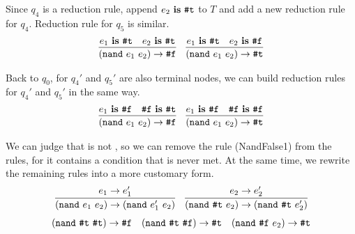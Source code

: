 Since $q_4$ is a reduction rule, append $e_2~\mbox{\rm \bf is}~\mbox{\tt \#t}$ to $T$ and add a new reduction rule for $q_4$. Reduction rule for $q_5$ is similar.
\[
    \begin{array}{c}
        \infer{(\m{nand}~e_1~e_2) \to \m{\#f}}{e_1~\key{is}~\m{\#t}\quad e_2~\key{is}~\m{\#t}}
        \quad
        \infer{(\m{nand}~e_1~e_2) \to \m{\#t}}{e_1~\key{is}~\m{\#t}\quad e_2~\key{is}~\m{\#f}}
    \end{array}
\]

Back to $q_0$, for $q_4'$ and $q_5'$ are also terminal nodes, we can build reduction rules for $q_4'$ and $q_5'$ in the same way.
\[
    \begin{array}{c}
        \infer{(\m{nand}~e_1~e_2) \to \m{\#f}}{e_1~\key{is}~\m{\#f}\quad \m{\#f}~\key{is}~\m{\#t}}
        \quad
        \infer{(\m{nand}~e_1~e_2) \to \m{\#t}}{e_1~\key{is}~\m{\#f}\quad \m{\#f}~\key{is}~\m{\#f}}
    \end{array}
\]

We can judge that  is not , so we can remove the rule (NandFalse1) from the rules, for it contains a condition that is never met. At the same time, we rewrite the remaining rules into a more customary form.
\[
    \begin{array}{cc}
        \infer{(\m{nand}~e_1~e_2) \to (\m{nand}~e_1'~e_2)}{e_1 \to e_1'}
         &
        \infer{(\m{nand}~\m{\#t}~e_2) \to (\m{nand}~\m{\#t}~e_2')}{e_2 \to e_2'}
    \end{array}
\]\[
    \begin{array}{ccc}
        (\mbox{\tt nand}~\mbox{\tt \#t}~\mbox{\tt \#t}) \to \mbox{\tt \#f}
         &
        (\mbox{\tt nand}~\mbox{\tt \#t}~\mbox{\tt \#f}) \to \mbox{\tt \#t}
         &
        (\mbox{\tt nand}~\mbox{\tt \#f}~e_2) \to \mbox{\tt \#t}
    \end{array}
\]




